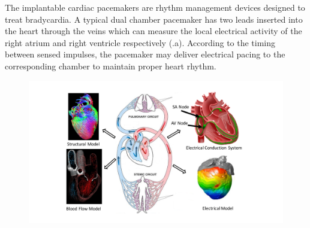 The implantable cardiac pacemakers are rhythm management devices designed to treat bradycardia. A typical dual chamber pacemaker has two leads inserted into the heart through the veins which can measure the local electrical activity of the right atrium and right ventricle respectively (.a). According to the timing between sensed impulses, the pacemaker may deliver electrical pacing to the corresponding chamber to maintain proper heart rhythm.

\begin{figure}[!t]
\centering
		\includegraphics[width=1.1\textwidth]{figs/models.pdf}
		
\caption{\small }
\label{fig:models}
\end{figure} 
